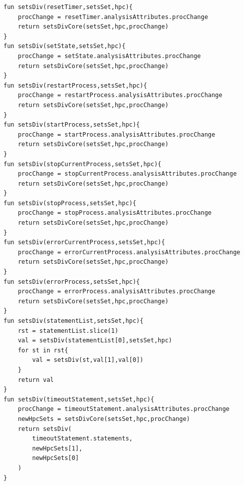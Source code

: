 \begin{lstlisting}[style=PseudoStyle,mathescape=true]
fun setsDiv(resetTimer,setsSet,hpc){
    procChange = resetTimer.analysisAttributes.procChange
    return setsDivCore(setsSet,hpc,procChange)
}
fun setsDiv(setState,setsSet,hpc){
    procChange = setState.analysisAttributes.procChange
    return setsDivCore(setsSet,hpc,procChange)
}
fun setsDiv(restartProcess,setsSet,hpc){
    procChange = restartProcess.analysisAttributes.procChange
    return setsDivCore(setsSet,hpc,procChange)
}
fun setsDiv(startProcess,setsSet,hpc){
    procChange = startProcess.analysisAttributes.procChange
    return setsDivCore(setsSet,hpc,procChange)
}
fun setsDiv(stopCurrentProcess,setsSet,hpc){
    procChange = stopCurrentProcess.analysisAttributes.procChange
    return setsDivCore(setsSet,hpc,procChange)
}
fun setsDiv(stopProcess,setsSet,hpc){
    procChange = stopProcess.analysisAttributes.procChange
    return setsDivCore(setsSet,hpc,procChange)
}
fun setsDiv(errorCurrentProcess,setsSet,hpc){
    procChange = errorCurrentProcess.analysisAttributes.procChange
    return setsDivCore(setsSet,hpc,procChange)
}
fun setsDiv(errorProcess,setsSet,hpc){
    procChange = errorProcess.analysisAttributes.procChange
    return setsDivCore(setsSet,hpc,procChange)
}
fun setsDiv(statementList,setsSet,hpc){
    rst = statementList.slice(1)
    val = setsDiv(statementList[0],setsSet,hpc)
    for st in rst{
        val = setsDiv(st,val[1],val[0])
    }
    return val
}
fun setsDiv(timeoutStatement,setsSet,hpc){
    procChange = timeoutStatement.analysisAttributes.procChange
    newHpcSets = setsDivCore(setsSet,hpc,procChange)
    return setsDiv(
        timeoutStatement.statements,
        newHpcSets[1],
        newHpcSets[0]
    )
}


\end{lstlisting}
